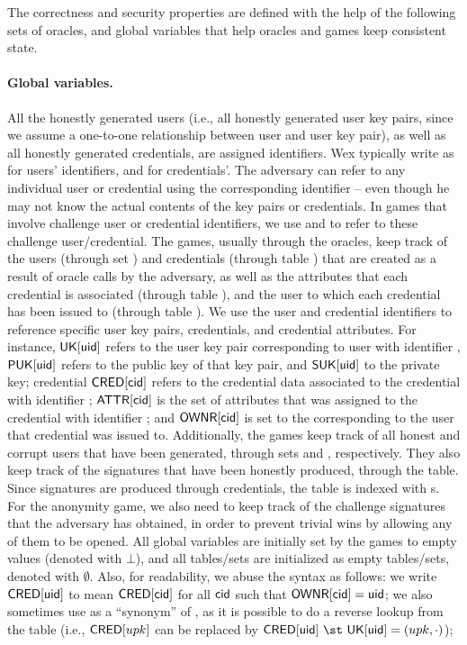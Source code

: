 The correctness and security properties are defined with the help of the
following sets of oracles, and global variables that help oracles and games
keep consistent state.

\paragraph{Global variables.} %
All the honestly generated users (i.e., all honestly generated user key pairs,
since we assume a one-to-one relationship between user and user key pair), as
well as all honestly generated credentials, are assigned identifiers. Wex
typically write as \uid for users' identifiers, and \cid for credentials'. The
adversary can
refer to any individual user or credential using the corresponding identifier --
even though he may not know the actual contents of the key pairs or credentials.
In games that involve challenge user or credential identifiers, we use \cuid and
\ccid to refer to these challenge user/credential.
%
The games, usually through the oracles, keep track of the users (through
set \UK) and credentials (through table \CRED) that are created as a result of
oracle calls by the adversary, as well as the attributes that each credential
is associated (through table \ATTR), and the user to which each credential has
been issued to (through table \OWNR). We use the user and credential identifiers
to reference specific user key pairs, credentials, and credential attributes.
For instance, $\mathsf{UK}[\mathsf{uid}]$ refers to the user key pair corresponding to user
with identifier \uid, $\mathsf{P}\mathsf{UK}[\mathsf{uid}]$ refers to the public key of that key pair,
and $\mathsf{S}\mathsf{UK}[\mathsf{uid}]$ to the private key; credential $\mathsf{CRED}[\mathsf{cid}]$ refers to the
credential data associated to the credential with identifier \cid; $\mathsf{ATTR}[\mathsf{cid}]$
is the set of attributes that was assigned to the credential with identifier
\cid; and $\mathsf{OWNR}[\mathsf{cid}]$ is set to the \uid corresponding to the user that
credential \cid was issued to.
%
Additionally, the games keep track of all honest and corrupt users that have
been generated, through sets \HU and \CU, respectively. They also keep track of
the signatures that have been honestly produced, through the \SIG table. Since
signatures are produced through credentials, the \SIG table is indexed with
{\cid}s. For the anonymity game, we also need to keep track of the challenge
signatures that the adversary has obtained, in order to prevent trivial wins
by allowing any of them to be opened. 
%
All global variables are initially set by the games to empty values (denoted
with $\bot$), and all tables/sets are initialized as empty tables/sets, denoted
with $\emptyset$. Also, for readability, we abuse the syntax as follows: we
write $\mathsf{CRED}[\mathsf{uid}]$ to mean $\mathsf{CRED}[\mathsf{cid}]$ for all $\mathsf{cid}$ such that
$\mathsf{OWNR}[\mathsf{cid}] = \mathsf{uid}$; we also sometimes use \upk as a ``synonym'' of \uid, as it
is possible to do a reverse lookup from the \UK table (i.e., $\mathsf{CRED}[upk]$ can
be replaced by $\CRED[\uid]~\st~\UK[\uid]=(\upk,\cdot)$); 

